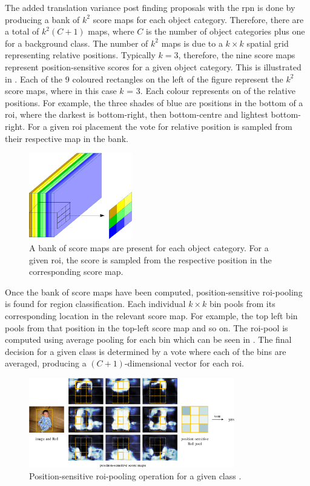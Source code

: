 The added translation variance post finding proposals with the \gls{rpn} is done by producing a bank of $k^2$ score maps for each object category. Therefore, there are a total of $k^2(C + 1)$ maps, where $C$ is the number of object categories plus one for a background class. The number of $k^2$ maps is due to a $k \times k$ spatial grid representing relative positions. Typically $k = 3$, therefore, the nine score maps represent position-sensitive scores for a given object category. This is illustrated in . Each of the 9 coloured rectangles on the left of the figure represent the $k^2$ score maps, where in this case $k$ = 3. Each colour represents on of the relative positions. For example, the three shades of blue are positions in the bottom of a \gls{roi}, where the darkest is bottom-right, then bottom-centre and lightest bottom-right. For a given \gls{roi} placement the vote for relative position is sampled from their respective map in the bank.

\begin{figure}[H]
  \centering
    \includegraphics[width=0.4\textwidth]{Figs/Techanal/scoremaps-crop.pdf}
     \caption{A bank of score maps are present for each object category. For a given \gls{roi}, the score is sampled from the respective position in the corresponding score map.}
    \label{fig:scoremaps}
\end{figure}

Once the bank of score maps have been computed, position-sensitive \gls{roi}-pooling is found for region classification. Each individual $k \times k$ bin pools from its corresponding location in the relevant score map. For example, the top left bin pools from that position in the top-left score map and so on. The \gls{roi}-pool is computed using average pooling for each bin which can be seen in . The final decision for a given class is determined by a vote where each of the bins are averaged, producing a $(C+1)$-dimensional vector for each \gls{roi}.

\begin{figure}[H]
  \centering
    \includegraphics[width=0.8\textwidth]{Figs/Techanal/rfcnpooling.png}
      \caption{Position-sensitive \gls{roi}-pooling operation for a given class \cite{rfcn}.}
    \label{fig:rfcnpooling}
\end{figure}


